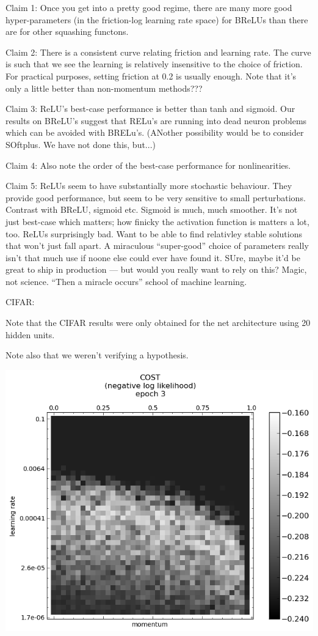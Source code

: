 \documentclass[10pt]{article}
\begin{document}
Claim 1: Once you get into a pretty good regime, there are many more
good hyper-parameters (in the friction-log learning rate space) for
BReLUs than there are for other squashing functons.  

Claim 2: There is a consistent curve relating friction and learning
rate.  The curve is such that we see the learning is relatively
insensitive to the choice of friction.  For practical purposes,
setting friction at 0.2 is usually enough.  Note that it's only a
little better than non-momentum methods???

Claim 3: ReLU's best-case performance is better than tanh and sigmoid.
Our results on BReLU's suggest that RELu's are running into dead
neuron problems which can be avoided with BRELu's.  (ANother
possibility would be to consider SOftplus.  We have not done this,
but...)

Claim 4: Also note the order of the best-case performance for
nonlinearities.

Claim 5: ReLUs seem to have substantially more stochastic behaviour.
They provide good performance, but seem to be very sensitive to small
perturbations. Contrast with BReLU, sigmoid etc.  Sigmoid is much,
much smoother.  It's not just best-case which matters; how finicky the
activation function is matters a lot, too.  ReLUs surprisingly bad.
Want to be able to find relativley stable solutions that won't just
fall apart.  A miraculous ``super-good'' choice of parameters really
isn't that much use if noone else could ever have found it. SUre,
maybe it'd be great to ship in production --- but would you really
want to rely on this?  Magic, not science.  ``Then a miracle occurs''
school of machine learning.




CIFAR:

Note that the CIFAR results were only obtained for the net
architecture using 20 hidden units.

Note also that we weren't verifying a hypothesis.

\includegraphics[scale=0.5]{plots/detailed/LF-20R10R-20T10-CIFAR-3.png}
\end{document}
